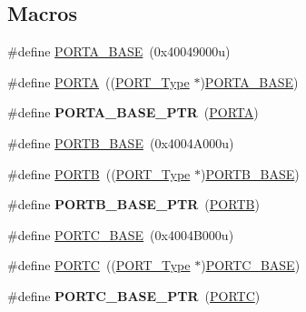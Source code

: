\subsection*{Macros}
\begin{DoxyCompactItemize}
\item 
\#define \hyperlink{group__PORT__Peripheral__Access__Layer_gae3d20f730f9619aabbf94e2efd1de34c}{P\+O\+R\+T\+A\+\_\+\+B\+A\+SE}~(0x40049000u)
\item 
\#define \hyperlink{group__PORT__Peripheral__Access__Layer_ga7c8a7f98a98d8cb125dd57a66720ab30}{P\+O\+R\+TA}~((\hyperlink{structPORT__Type}{P\+O\+R\+T\+\_\+\+Type} $\ast$)\hyperlink{group__PORT__Peripheral__Access__Layer_gae3d20f730f9619aabbf94e2efd1de34c}{P\+O\+R\+T\+A\+\_\+\+B\+A\+SE})
\item 
\#define {\bfseries P\+O\+R\+T\+A\+\_\+\+B\+A\+S\+E\+\_\+\+P\+TR}~(\hyperlink{group__PORT__Peripheral__Access__Layer_ga7c8a7f98a98d8cb125dd57a66720ab30}{P\+O\+R\+TA})\hypertarget{group__PORT__Peripheral__Access__Layer_gaa18ec7594fe603225220ec6eda4a19ce}{}\label{group__PORT__Peripheral__Access__Layer_gaa18ec7594fe603225220ec6eda4a19ce}

\item 
\#define \hyperlink{group__PORT__Peripheral__Access__Layer_ga2a668049a5e6c09cf6a7164ffca38a7e}{P\+O\+R\+T\+B\+\_\+\+B\+A\+SE}~(0x4004\+A000u)
\item 
\#define \hyperlink{group__PORT__Peripheral__Access__Layer_ga09a0c85cd3da09d9cdf63a5ac4c39f77}{P\+O\+R\+TB}~((\hyperlink{structPORT__Type}{P\+O\+R\+T\+\_\+\+Type} $\ast$)\hyperlink{group__PORT__Peripheral__Access__Layer_ga2a668049a5e6c09cf6a7164ffca38a7e}{P\+O\+R\+T\+B\+\_\+\+B\+A\+SE})
\item 
\#define {\bfseries P\+O\+R\+T\+B\+\_\+\+B\+A\+S\+E\+\_\+\+P\+TR}~(\hyperlink{group__PORT__Peripheral__Access__Layer_ga09a0c85cd3da09d9cdf63a5ac4c39f77}{P\+O\+R\+TB})\hypertarget{group__PORT__Peripheral__Access__Layer_ga585b4782d1ceb44492289af0019480f9}{}\label{group__PORT__Peripheral__Access__Layer_ga585b4782d1ceb44492289af0019480f9}

\item 
\#define \hyperlink{group__PORT__Peripheral__Access__Layer_ga0018f0edf7f8030868f9cc791275378d}{P\+O\+R\+T\+C\+\_\+\+B\+A\+SE}~(0x4004\+B000u)
\item 
\#define \hyperlink{group__PORT__Peripheral__Access__Layer_ga68fea88642279a70246e026e7221b0a5}{P\+O\+R\+TC}~((\hyperlink{structPORT__Type}{P\+O\+R\+T\+\_\+\+Type} $\ast$)\hyperlink{group__PORT__Peripheral__Access__Layer_ga0018f0edf7f8030868f9cc791275378d}{P\+O\+R\+T\+C\+\_\+\+B\+A\+SE})
\item 
\#define {\bfseries P\+O\+R\+T\+C\+\_\+\+B\+A\+S\+E\+\_\+\+P\+TR}~(\hyperlink{group__PORT__Peripheral__Access__Layer_ga68fea88642279a70246e026e7221b0a5}{P\+O\+R\+TC})\hypertarget{group__PORT__Peripheral__Access__Layer_ga03c740cdda17711afafc932723871474}{}\label{group__PORT__Peripheral__Access__Layer_ga03c740cdda17711afafc932723871474}


\end{DoxyCompactItemize}
